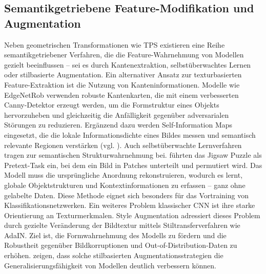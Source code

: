 \subsection{ Semantikgetriebene Feature-Modifikation und Augmentation}
Neben geometrischen Transformationen wie \ac{TPS} existieren eine Reihe semantikgetriebener Verfahren, die die Feature-Wahrnehmung von Modellen gezielt beeinflussen – sei es durch Kantenextraktion, selbstüberwachtes Lernen oder stilbasierte Augmentation.
Ein alternativer Ansatz zur texturbasierten Feature-Extraktion ist die Nutzung von Kanteninformationen. Modelle wie EdgeNetRob verwenden robuste Kantenkarten, die mit einem verbesserten Canny-Detektor erzeugt werden, um die Formstruktur eines Objekts hervorzuheben und gleichzeitig die Anfälligkeit gegenüber adversarialen Störungen zu reduzieren. Ergänzend dazu werden Self-Information Maps eingesetzt, die die lokale Informationsdichte eines Bildes messen und semantisch relevante Regionen verstärken (vgl. \textcite{Zhang_2023_arXiv}).
Auch selbstüberwachte Lernverfahren tragen zur semantischen Strukturwahrnehmung bei. \textcite{noroozi2016unsupervised} führten das Jigsaw Puzzle als Pretext-Task ein, bei dem ein Bild in Patches unterteilt und permutiert wird. Das Modell muss die ursprüngliche Anordnung rekonstruieren, wodurch es lernt, globale Objektstrukturen und Kontextinformationen zu erfassen – ganz ohne gelabelte Daten. Diese Methode eignet sich besonders für das Vortraining von Klassifikationsnetzwerken.
Ein weiteres Problem klassischer \ac{CNN} ist ihre starke Orientierung an Texturmerkmalen. Style Augmentation adressiert dieses Problem durch gezielte Veränderung der Bildtextur mittels Stiltransferverfahren wie \ac{AdaIN}. Ziel ist, die Formwahrnehmung des Modells zu fördern und die Robustheit gegenüber Bildkorruptionen und Out-of-Distribution-Daten zu erhöhen. \textcite{lee2022shapeaugmentation} zeigen, dass solche stilbasierten Augmentationsstrategien die Generalisierungsfähigkeit von Modellen deutlich verbessern können.




